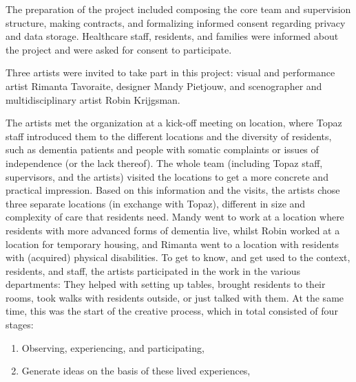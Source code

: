 \documentclass[authordate, empirical]{jote-new-article}
\begin{document}
	{	

	The preparation of the project included \mbox{composing} the core team and supervision structure, making contracts, and formalizing informed consent regarding privacy and data storage. Healthcare staff, residents, and families were informed about the project and were asked for consent to participate.







	Three artists were invited to take part in this project: visual and performance artist Rimanta Tavoraite, designer Mandy Pietjouw, and scenographer and multidisciplinary artist Robin Krijgsman.







	The artists met the organization at a kick-off meeting on location, where Topaz staff introduced them to the different locations and the diversity of residents, such as dementia patients and people with somatic complaints or issues of independence (or the lack thereof). The whole team (including Topaz staff, supervisors, and the artists) visited the locations to get a more concrete and practical impression. Based on this information and the visits, the artists chose three separate locations (in exchange with Topaz), different in size and complexity of care that residents need. Mandy went to work at a location where residents with more advanced forms of dementia live, whilst Robin worked at a location for temporary housing, and Rimanta went to a location with residents with (acquired) physical disabilities. To get to know, and get used to the context, residents, and staff, the artists participated in the work in the various departments: They helped with setting up tables, brought residents to their rooms, took walks with residents outside, or just talked with them. At the same time, this was the start of the creative process, which in total consisted of four stages:





	\begin{enumerate}


		\item Observing, experiencing, and participating,



		\item Generate ideas on the basis of these lived experiences,




\end{enumerate}}
\end{document}
